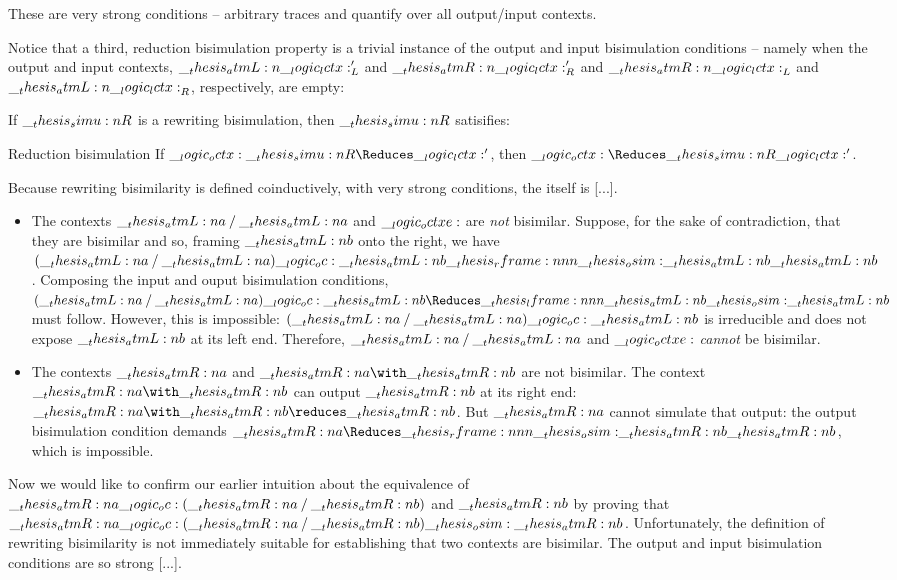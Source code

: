 These are very strong conditions -- arbitrary traces and quantify over all output/input contexts.

Notice that a third, reduction bisimulation property is a trivial instance of the output and input bisimulation conditions -- namely when the output and input contexts, $\__thesis_atmL:n {\__logic_lctx:}'_L$ and $\__thesis_atmR:n {\__logic_lctx:}'_R$ and $\__thesis_atmR:n {\__logic_lctx:}_L$ and $\__thesis_atmL:n {\__logic_lctx:}_R$, respectively, are empty:
\begin{theorem}\label{thm:bisim-reduction-closure}
  If $\__thesis_simu:n {R}$ is a rewriting bisimulation, then $\__thesis_simu:n {R}$ satisifies:
  \begin{thmdescription}
  \item[Reduction bisimulation]
    If $\octx \simu{R}\Reduces \lctx'$, then $\octx \Reduces\simu{R} \lctx'$.
  \end{thmdescription}
\end{theorem}

Because rewriting bisimilarity is defined coinductively, with very strong conditions, the  itself is [...].
\begin{itemize}
\item The contexts $\__thesis_atmL:n {a} \mathbin { / } \__thesis_atmL:n {a}$ and $\__logic_octxe:$ are \emph{not} bisimilar.
  Suppose, for the sake of contradiction, that they are bisimilar and so, framing $\__thesis_atmL:n {b}$ onto the right, we have $(\atmL{a} \pmir \atmL{a}) \oc \atmL{b} \rframe{\osim}{\atmL{b}} \atmL{b}$.
  Composing the input and ouput bisimulation conditions, $(\atmL{a} \pmir \atmL{a}) \oc \atmL{b} \Reduces\lframe{\atmL{b}}{\osim} \atmL{b}$ must follow.
  However, this is impossible: $(\__thesis_atmL:n {a} \mathbin { / } \__thesis_atmL:n {a}) \__logic_oc: \__thesis_atmL:n {b}$ is irreducible and does not expose $\__thesis_atmL:n {b}$ at its left end.
  Therefore, $\__thesis_atmL:n {a} \mathbin { / } \__thesis_atmL:n {a}$ and $\__logic_octxe:$ \emph{cannot} be bisimilar.

\item The contexts $\__thesis_atmR:n {a}$ and $\atmR{a} \with \atmR{b}$ are not bisimilar.
  The context $\atmR{a} \with \atmR{b}$ can output $\__thesis_atmR:n {b}$ at its right end: $\atmR{a} \with \atmR{b} \reduces \atmR{b}$.
  But $\__thesis_atmR:n {a}$ cannot simulate that output: the output bisimulation condition demands $\atmR{a} \Reduces\rframe{\osim}{\atmR{b}} \atmR{b}$, which is impossible.
\end{itemize}

Now we would like to confirm our earlier intuition about the equivalence of $\__thesis_atmR:n {a} \__logic_oc: (\__thesis_atmR:n {a} \mathbin { / } \__thesis_atmR:n {b})$ and $\__thesis_atmR:n {b}$ by proving that $\__thesis_atmR:n {a} \__logic_oc: (\__thesis_atmR:n {a} \mathbin { / } \__thesis_atmR:n {b}) \__thesis_osim: \__thesis_atmR:n {b}$.
Unfortunately, the definition of rewriting bisimilarity is not immediately suitable for establishing that two contexts are bisimilar.
The output and input bisimulation conditions are so strong [...].

